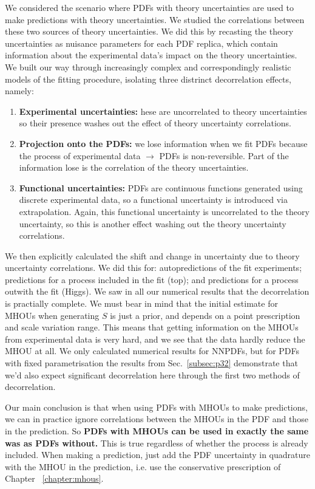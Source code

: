 We considered the scenario where PDFs with theory uncertainties are used to make predictions with theory uncertainties. We studied the correlations between these two sources of theory uncertainties. We did this by recasting the theory uncertainties as nuisance parameters for each PDF replica, which contain information about the experimental data's impact on the theory uncertainties. We built our way through increasingly complex and correspondingly realistic models of the fitting procedure, isolating three distrinct decorrelation effects, namely:
\begin{enumerate}
\item {\bf Experimental uncertainties: } hese are uncorrelated to theory uncertainties so their presence washes out the effect of theory uncertainty correlations.
\item {\bf Projection onto the PDFs: } we lose information when we fit PDFs because the process of experimental data $\to$ PDFs is non-reversible. Part of the information lose is the correlation of the theory uncertainties.
\item {\bf Functional uncertainties: } PDFs are continuous functions generated using discrete experimental data, so a functional uncertainty is introduced via extrapolation. Again, this functional uncertainty is uncorrelated to the theory uncertainty, so this is another effect washing out the theory uncertainty correlations.
\end{enumerate}

We then explicitly calculated the shift and change in uncertainty due to theory uncertainty correlations. We did this for: autopredictions of the fit experiments; predictions for a process included in the fit (top); and predictions for a process outwith the fit (Higgs). We saw in all our numerical results that the decorrelation is practially complete. We must bear in mind that the initial estimate for MHOUs when generating $S$ is just a prior, and depends on a point prescription and scale variation range. This means that getting information on the MHOUs from experimental data is very hard, and we see that the data hardly reduce the MHOU at all. We only calculated numerical results for NNPDFs, but for PDFs with fixed parametrisation the results from Sec.~\ref{subsec:p32} demonstrate that we'd also expect significant decorrelation here through the first two methods of decorrelation.

Our main conclusion is that when using PDFs with MHOUs to make predictions, we can in practice ignore correlations between the MHOUs in the PDF and those in the prediction. So {\bf PDFs with MHOUs can be used in exactly the same was as PDFs without.} This is true regardless of whether the process is already included. When making a prediction, just add the PDF uncertainty in quadrature with the MHOU in the prediction, i.e. use the conservative prescription of Chapter ~\ref{chapter:mhous}. 

